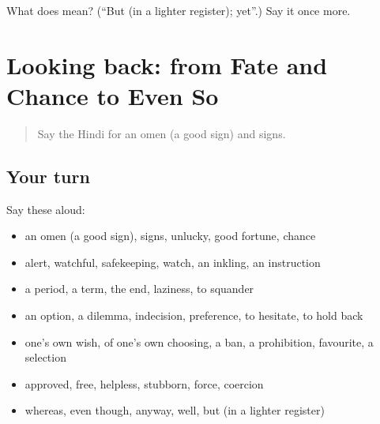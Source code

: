 \begin{tcolorbox}[breakable,colback=teal!4,colframe=teal!35!black,title={Before you move on}]
What does  mean? (\textquotedblleft{}But (in a lighter register); yet\textquotedblright{}.) Say it once more.
\end{tcolorbox}
\section[(dialogue)]{Looking back: from Fate and Chance to Even So}

\label{lesson:HI-R552-review-546-552}



\begin{quote}
Say the Hindi for an omen (a good sign) and signs.
\end{quote}

\subsection*{Your turn}
Say these aloud:

\begin{itemize}
\raggedright
  \item an omen (a good sign), signs, unlucky, good fortune, chance
  \item alert, watchful, safekeeping, watch, an inkling, an instruction
  \item a period, a term, the end, laziness, to squander
  \item an option, a dilemma, indecision, preference, to hesitate, to hold back
  \item one's own wish, of one's own choosing, a ban, a prohibition, favourite, a selection
  \item approved, free, helpless, stubborn, force, coercion
  \item whereas, even though, anyway, well, but (in a lighter register)
\end{itemize}

